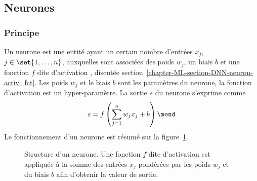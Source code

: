 \subsection{Neurones}\label{chapter-ML-section-DNN-neuron}
\subsubsection{Principe}
Un neurone est une entité ayant
un certain nombre d'entrées $x_j$, $j\in\set{1,\ldots,n}$,
auxquelles sont associées des poids $w_j$,
un biais $b$
et
une fonction $f$ dite d'\og activation \fg, discutée section~\ref{chapter-ML-section-DNN-neuron-activ_fct}.
Les poids $w_j$ et le biais $b$ sont les paramètres du neurone,
la fonction d'activation est un hyper-paramètre.
La sortie $s$ du neurone s'exprime comme
\begin{equation}
s = f\left(\sum_{j=1}^n w_jx_j + b\right)
\mend
\end{equation}
Le fonctionnement d'un neurone est résumé sur la figure~\ref{fig-chapter-ML-section-DNN-neuron-neuron_structure}.
\begin{figure}[h]
\centering

\caption[Structure d'un neurone.]{Structure d'un neurone. Une fonction $f$ dite d'\og activation \fg{} est appliquée à la somme des entrées $x_j$ pondérées par les poids $w_j$ et du biais $b$ afin d'obtenir la valeur de sortie.}
\label{fig-chapter-ML-section-DNN-neuron-neuron_structure}
\end{figure}
